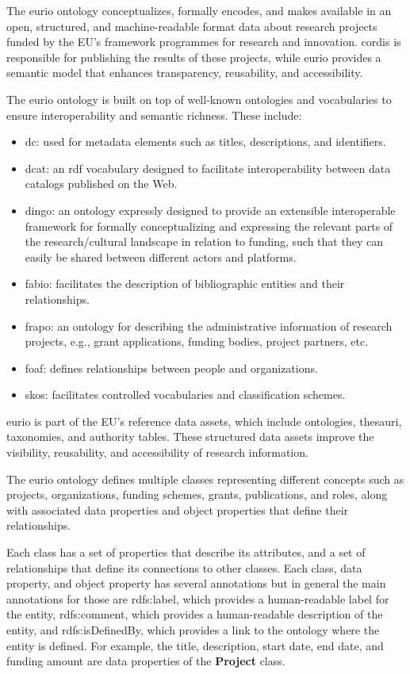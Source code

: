 The \gls{eurio} ontology conceptualizes, formally encodes, and makes available in an open, structured, and machine-readable format data about research projects funded by the EU's framework programmes for research and innovation.
\gls{cordis} is responsible for publishing the results of these projects, while \gls{eurio} provides a semantic model that enhances transparency, reusability, and accessibility.

The \gls{eurio} ontology is built on top of well-known ontologies and vocabularies to ensure interoperability and semantic richness.
These include:
\begin{itemize}
    \item \gls{dc}: used for metadata elements such as titles, descriptions, and identifiers.
    \item \gls{dcat}: an \gls{rdf} vocabulary designed to facilitate interoperability between data catalogs published on the Web.
    \item \gls{dingo}: an ontology expressly designed to provide an extensible interoperable framework for formally conceptualizing and expressing the relevant parts of the research/cultural landscape in relation to funding, such that they can easily be shared between different actors and platforms.
    \item \gls{fabio}: facilitates the description of bibliographic entities and their relationships.
    \item \gls{frapo}: an ontology for describing the administrative information of research projects, e.g., grant applications, funding bodies, project partners, etc.
    \item \gls{foaf}: defines relationships between people and organizations.
    \item \gls{skos}: facilitates controlled vocabularies and classification schemes.
\end{itemize}

\gls{eurio} is part of the EU's reference data assets, which include ontologies, thesauri, taxonomies, and authority tables.
These structured data assets improve the visibility, reusability, and accessibility of research information.

The \gls{eurio} ontology defines multiple classes representing different concepts such as projects, organizations, funding schemes, grants, publications, and roles, along with associated data properties and object properties that define their relationships.

Each class has a set of properties that describe its attributes, and a set of relationships that define its connections to other classes.
Each class, data property, and object property has several annotations but in general the main annotations for those are rdfs:label, which provides a human-readable label for the entity, rdfs:comment, which provides a human-readable description of the entity, and rdfs:isDefinedBy, which provides a link to the ontology where the entity is defined.
For example, the title, description, start date, end date, and funding amount are data properties of the \textbf{Project} class.

